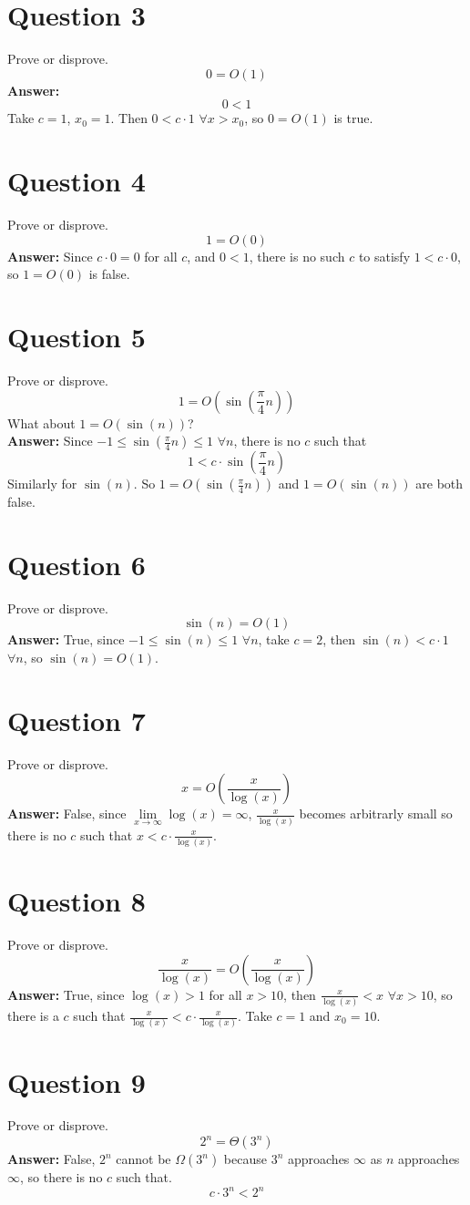 \documentclass[openany]{report}
\begin{document}
\section{Question 3}
Prove or disprove.
\[0 = O(1)\]
\textbf{Answer:}
\[0 < 1\]
Take $c = 1$, $x_0 = 1$. Then $0 < c \cdot 1$ $\forall x > x_0$, so $0 = O(1)$ is true.
\section{Question 4}
Prove or disprove.
\[1 = O(0)\]
\textbf{Answer:}
Since $c \cdot 0 = 0$ for all $c$, and $0 < 1$, there is no such $c$ to satisfy $1 < c \cdot 0$, so $1 = O(0)$ is false.
\section{Question 5}
Prove or disprove.
\[1 = O\left(\sin\left(\frac{\pi}{4}n\right)\right)\]
What about $1 = O(\sin(n))$?\\[2ex]
\textbf{Answer:}
Since $-1 \leq \sin\left(\frac{\pi}{4}n\right) \leq 1$ $\forall n$, there is no $c$ such that 
\[1 < c \cdot \sin\left(\frac{\pi}{4}n\right)\]
Similarly for $\sin(n)$. So $1 = O\left(\sin\left(\frac{\pi}{4}n\right)\right)$ and $1 = O(\sin(n))$ are both false.
\section{Question 6}
Prove or disprove.
\[\sin(n) = O(1)\]
\textbf{Answer:} True, since $-1 \leq \sin(n) \leq 1$ $\forall n$, take $c = 2$, then $\sin(n) < c \cdot 1$ $\forall n$, so $\sin(n) = O(1)$.
\section{Question 7}
Prove or disprove.
\[x = O\left(\frac{x}{\log(x)}\right)\]
\textbf{Answer:} False, since $\lim\limits_{x\rightarrow \infty} \log(x) = \infty$, $\frac{x}{\log(x)}$ becomes arbitrarly small so there is no $c$ such that $x < c \cdot \frac{x}{\log(x)}$.
\section{Question 8}
Prove or disprove.
\[\frac{x}{\log(x)} = O\left(\frac{x}{\log(x)}\right)\]
\textbf{Answer:} True, since $\log(x) > 1$ for all $x > 10$, then $\frac{x}{\log(x)} < x$ $\forall x > 10$, so there is a $c$ such that $\frac{x}{\log(x)} < c \cdot \frac{x}{\log(x)}$. Take $c = 1$ and $x_0 = 10$.
\section{Question 9}
Prove or disprove.
\[2^n = \Theta(3^n)\]
\textbf{Answer:} False, $2^n$ cannot be $\Omega(3^n)$ because $3^n$ approaches $\infty$ as $n$ approaches $\infty$, so there is no $c$ such that. 
\[c \cdot 3^n < 2^n\]
\end{document}
